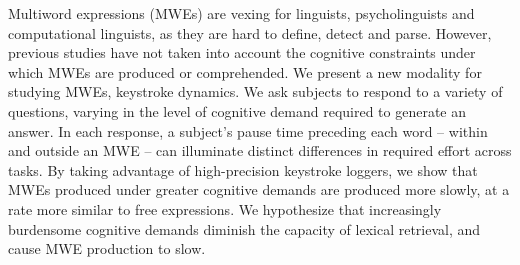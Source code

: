 Multiword expressions (MWEs) are vexing for linguists, psycholinguists and computational linguists, as they are hard to define, detect and parse. However, previous studies have not taken into account the cognitive constraints under which MWEs are produced or comprehended. We present a new modality for studying MWEs, keystroke dynamics. We ask subjects to respond to a variety of questions, varying in the level of cognitive demand required to generate an answer. In each response, a subject's pause time preceding each word -- within and outside an MWE -- can illuminate distinct differences in required effort across tasks. By taking advantage of high-precision keystroke loggers, we show that MWEs produced under greater cognitive demands are produced more slowly, at a rate more similar to free expressions. We hypothesize that increasingly burdensome cognitive demands diminish the capacity of lexical retrieval, and cause MWE production to slow.
